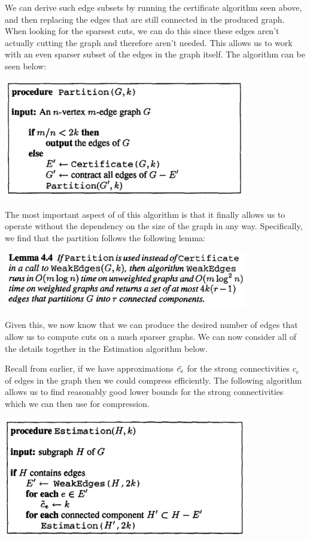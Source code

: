 \documentclass[11pt]{article}
\begin{document}
We can derive such edge subsets by running the certificate algorithm seen above, and then replacing the edges that are still connected in the produced graph. When looking for the sparsest cuts, we can do this since these edges aren't actually cutting the graph and therefore aren't needed. This allows us to work with an even sparser subset of the edges in the graph itself. The algorithm can be seen below:

\begin{center}
\includegraphics[width=0.8\textwidth]{figures/Partition.png}
\end{center}

The most important aspect of of this algorithm is that it finally allows us to operate without the dependency on the size of the graph in any way. Specifically, we find that the partition follows the following lemma:

\begin{center}
\includegraphics[width=0.8\textwidth]{figures/Lemma4_4.png}
\end{center}

Given this, we now know that we can produce the desired number of edges that allow us to compute cuts on a much sparser graphs. We can now consider all of the details together in the Estimation algorithm below.

Recall from earlier, if we have approximations $\Tilde{c_e}$ for the strong connectivities $c_e$ of edges in the graph then we could compress efficiently. The following algorithm allows us to find reasonably good lower bounds for the strong connectivities which we can then use for compression.

\begin{center}
\includegraphics[width=0.8\textwidth]{figures/Estimation.png}
\end{center}
\end{document}
